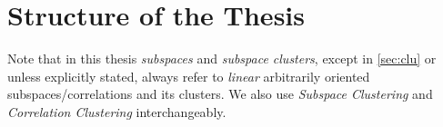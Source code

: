 \section{Structure of the Thesis}
Note that in this thesis \textit{subspaces} and \textit{subspace clusters}, except in \autoref{sec:clu} or unless explicitly stated, always refer to \textit{linear} arbitrarily oriented subspaces/correlations and its clusters. We also use \textit{Subspace Clustering} and \textit{Correlation Clustering} interchangeably.